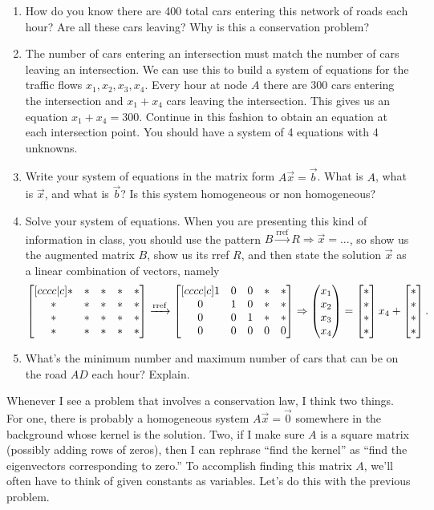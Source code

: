 \begin{problem}
\begin{enumerate}
 \item How do you know there are 400 total cars entering this network of roads each hour? Are all these cars leaving? Why is this a conservation problem?
 \item The number of cars entering an intersection must match the number of cars leaving an intersection.  We can use this to build a system of equations for the traffic flows $x_1, x_2,x_3, x_4$.  Every hour at node $A$ there are 300 cars entering the intersection and $x_1+x_4$ cars leaving the intersection. This gives us an equation $x_1+x_4=300$. Continue in this fashion to obtain an equation at each intersection point. You should have a system of 4 equations with 4 unknowns.
 \item 
Write your system of equations in the matrix form $A\vec x = \vec b$. What is $A$, what is $\vec x$, and what is $\vec b$? Is this system homogeneous or non homogeneous? 
 \item Solve your system of equations.  When you are presenting this kind of information in class, you should use the pattern $B\xrightarrow{\text{rref}}R\Rightarrow\vec x = ...$, so show us the augmented matrix $B$, show us its rref $R$, and then state the solution $\vec x$ as a linear combination of vectors, namely
$$
\begin{bmatrix} [cccc|c]*&*&*&*&*\\ *&*&*&*&*\\ *&*&*&*&*\\ *&*&*&*&* \end{bmatrix}
\xrightarrow{\text{rref}}\begin{bmatrix} [cccc|c]1&0&0&*&*\\ 0&1&0&*&*\\ 0&0&1&*&*\\ 0&0&0&0&0 \end{bmatrix}\Rightarrow \begin{pmatrix} x_1\\x_2\\x_3\\x_4 \end{pmatrix}=\begin{bmatrix} *\\ *\\ *\\ *  \end{bmatrix}x_4+\begin{bmatrix} *\\ *\\ *\\ *  \end{bmatrix}.$$

 \item What's the minimum number and maximum number of cars that can be on the road $AD$ each hour? Explain.
\end{enumerate}
\end{problem}

Whenever I see a problem that involves a conservation law, I think two things. For one, there is probably a homogeneous system $A\vec x = \vec 0$ somewhere in the background whose kernel is the solution. Two, if I make sure $A$ is a square matrix (possibly adding rows of zeros), then I can rephrase ``find the kernel'' as ``find the eigenvectors corresponding to zero.'' To accomplish finding this matrix $A$, we'll often have to think of given constants as variables.  Let's do this with the previous problem. 

